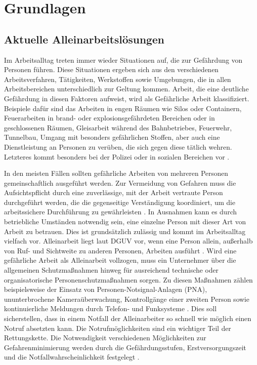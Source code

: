 \documentclass[thesis.tex]{subfiles}
\begin{document}
\chapter{Grundlagen}\label{chap:grundlagen}

\section{Aktuelle Alleinarbeitslösungen}\label{chap:alleinarbeit}

Im Arbeitsalltag treten immer wieder Situationen auf, die zur Gefährdung von Personen führen.
Diese Situationen ergeben sich aus den verschiedenen Arbeitsverfahren, Tätigkeiten, Werkstoffen sowie Umgebungen, die in allen Arbeitsbereichen unterschiedlich zur Geltung kommen.
Arbeit, die eine deutliche Gefährdung in diesen Faktoren aufweist, wird als \glqq Gefährliche Arbeit\grqq{} klassifiziert.
Beispiele dafür sind das Arbeiten in engen Räumen wie Silos oder Containern, Feuerarbeiten in brand- oder explosionsgefährdeten Bereichen oder in geschlossenen Räumen, Gleisarbeit während des Bahnbetriebes, Feuerwehr, Tunnelbau, Umgang mit besonders gefährlichen Stoffen, aber auch eine Dienstleistung an Personen zu verüben, die sich gegen diese tätlich wehren.
Letzteres kommt besonders bei der Polizei oder in sozialen Bereichen vor \cite[vgl.~S.~41 2.7.1]{Regel_100-001}.

In den meisten Fällen sollten gefährliche Arbeiten von mehreren Personen gemeinschaftlich ausgeführt werden.
Zur Vermeidung von Gefahren muss die Aufsichtspflicht durch eine zuverlässige, mit der Arbeit vertraute Person durchgeführt werden, die die gegenseitige Verständigung koordiniert, um die arbeitssichere Durchführung zu gewährleisten \cite[vgl.~§~8.1]{Vorschrift1_DGUV}.
In Ausnahmen kann es durch betriebliche Umständen notwendig sein, eine einzelne Person mit dieser Art von Arbeit zu betrauen. Dies ist grundsätzlich zulässig und kommt im Arbeitsalltag vielfach vor.
Alleinarbeit liegt laut DGUV vor, wenn eine Person allein, außerhalb von Ruf- und Sichtweite zu anderen Personen, Arbeiten ausführt \cite[S.~41~2.7.2]{Regel_100-001}.
Wird eine gefährliche Arbeit als Alleinarbeit vollzogen, muss ein Unternehmer über die allgemeinen Schutzmaßnahmen hinweg für ausreichend technische oder organisatorische Personenschutzmaßnahmen sorgen.
Zu diesen Maßnahmen zählen beispielsweise der Einsatz von Personen-Notsignal-Anlagen (PNA), ununterbrochene Kameraüberwachung, Kontrollgänge einer zweiten Person sowie kontinuierliche Meldungen durch Telefon- und Funksysteme \cite[vgl.~S.~43~2.7.2]{Regel_100-001}.
Dies soll sicherstellen, dass in einem Notfall der Alleinarbeiter so schnell wie möglich einen Notruf absetzten kann.
Die Notrufmöglichkeiten sind ein wichtiger Teil der Rettungskette.
Die Notwendigkeit verschiedenen Möglichkeiten zur Gefahrenminimierung werden durch die Gefährdungsstufen, Erstversorgungszeit und die Notfallwahrscheinlichkeit festgelegt \cite[vgl.~S.~13-18]{Regel_112-139}.
\end{document}
